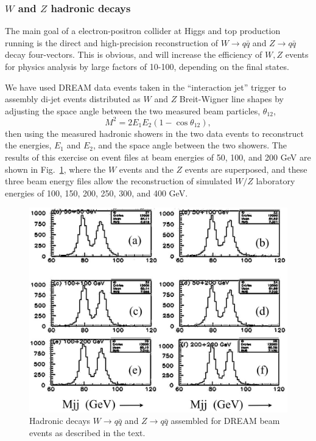 \subsubsection{$W$ and $Z$ hadronic decays}

The main goal of a electron-positron collider at  Higgs and top production running is the direct and high-precision reconstruction of  $W \rightarrow q\bar{q}$ and  $Z \rightarrow q\bar{q}$ decay four-vectors.   This is obvious, and will increase the efficiency of $W,Z$ events for physics analysis by large factors of 10-100, depending on the final states.

We have used DREAM data events taken in the ``interaction jet'' trigger to assembly di-jet events distributed as $W$ and $Z$ Breit-Wigner line shapes by adjusting the space angle between the two measured beam particles, $\theta_{12}$, 
\begin{displaymath}
   M^2 = 2 E_1 E_2 ( 1 - \cos \theta_{12}),
\end{displaymath}
then using the measured hadronic showers in the two data events to reconstruct the energies, $E_1$ and $E_2$, and the space angle between the two showers.  The results of this exercise on event files at beam energies of 50, 100, and 200 GeV are shown in Fig.~\ref{fig:wz}, where the $W$ events and the $Z$ events are superposed, and these three beam energy files allow the reconstruction of simulated $W/Z$ laboratory energies of 100, 150, 200, 250, 300, and 400 GeV.  

\begin{figure}
 \centering
 \includegraphics[scale=0.45]{Calorimeter/DualReadout/WZ-Dream-data-all.jpg}
  \caption{Hadronic decays $W \rightarrow q\bar{q}$ and  $Z \rightarrow q\bar{q}$ assembled for DREAM beam events as described in the text.}
  \label{fig:wz}
\end{figure}

